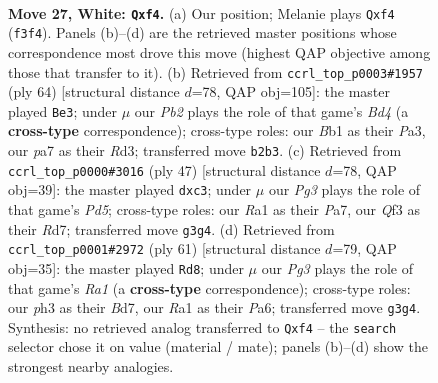 \documentclass[11pt]{article}
\begin{document}
\clearpage

\begin{figure}[p]\centering
\begin{subfigure}{0.46\textwidth}\centering
\resizebox{\linewidth}{!}{%
\newchessgame
\chessboard[
  setfen={1r1r4/pp3pk1/8/6qp/b3Pb2/5QPp/PP3P2/RB2R1K1 w - - 0 27},
  showmover=false,
  pgfstyle=straightmove, color=movearrow, markmove={f3-f4}
]}
\caption{}
\end{subfigure}\hfill
\begin{subfigure}{0.46\textwidth}\centering
\resizebox{\linewidth}{!}{%
\newchessgame
\chessboard[
  setfen={4r3/6k1/p1qbrpp1/1pP4p/3B4/PQ1R3P/5PP1/2R3K1 w - - 4 33},
  showmover=false,
  pgfstyle=straightmove, color=movearrow, markmove={d4-e3}
]}
\caption{}
\end{subfigure}
\\[4pt]
\begin{subfigure}{0.46\textwidth}\centering
\resizebox{\linewidth}{!}{%
\newchessgame
\chessboard[
  setfen={6k1/p2r1pb1/6pp/1P1p1q2/P2p4/1PB4P/5PP1/2RQR1K1 b - - 0 24},
  showmover=false,
  pgfstyle=straightmove, color=movearrow, markmove={d4-c3}
]}
\caption{}
\end{subfigure}\hfill
\begin{subfigure}{0.46\textwidth}\centering
\resizebox{\linewidth}{!}{%
\newchessgame
\chessboard[
  setfen={r6k/3b2qp/pp1P4/2pBrp2/P7/8/1P1Q1RP1/3R2K1 b - - 0 31},
  showmover=false,
  pgfstyle=straightmove, color=movearrow, markmove={a8-d8}
]}
\caption{}
\end{subfigure}
\caption{\textbf{Move 27, White: \texttt{Qxf4}.} (a) Our position; Melanie plays \texttt{Qxf4} (\texttt{f3f4}). Panels (b)--(d) are the retrieved master positions whose correspondence most drove this move (highest QAP objective among those that transfer to it). (b) Retrieved from \texttt{ccrl\_top\_p0003\#1957} (ply 64) [structural distance $d$=78, QAP obj=105]: the master played \texttt{Be3}; under $\mu$ our \emph{Pb2} plays the role of that game's \emph{Bd4} (a \textbf{cross-type} correspondence); cross-type roles: our \emph{B}b1 as their \emph{P}a3, our \emph{p}a7 as their \emph{R}d3; transferred move \texttt{b2b3}. (c) Retrieved from \texttt{ccrl\_top\_p0000\#3016} (ply 47) [structural distance $d$=78, QAP obj=39]: the master played \texttt{dxc3}; under $\mu$ our \emph{Pg3} plays the role of that game's \emph{Pd5}; cross-type roles: our \emph{R}a1 as their \emph{P}a7, our \emph{Q}f3 as their \emph{R}d7; transferred move \texttt{g3g4}. (d) Retrieved from \texttt{ccrl\_top\_p0001\#2972} (ply 61) [structural distance $d$=79, QAP obj=35]: the master played \texttt{Rd8}; under $\mu$ our \emph{Pg3} plays the role of that game's \emph{Ra1} (a \textbf{cross-type} correspondence); cross-type roles: our \emph{p}h3 as their \emph{B}d7, our \emph{R}a1 as their \emph{P}a6; transferred move \texttt{g3g4}. Synthesis: no retrieved analog transferred to \texttt{Qxf4} -- the \texttt{search} selector chose it on value (material / mate); panels (b)--(d) show the strongest nearby analogies.}
\label{fig:thought-m52}
\end{figure}
\end{document}
